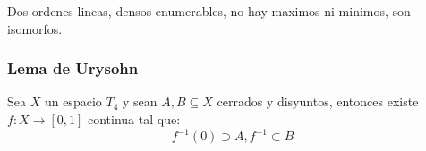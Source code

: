 Dos ordenes lineas, densos enumerables, no hay maximos ni minimos, son isomorfos.

\subsubsection*{Lema de Urysohn}

Sea $ X $ un espacio $ T_4 $ y sean $ A,B \subseteq X $ cerrados y disyuntos, entonces existe $ f: X \rightarrow [0,1] $ continua tal que:
\[ f^{-1} (0) \supset A, f^{-1} \subset B \]